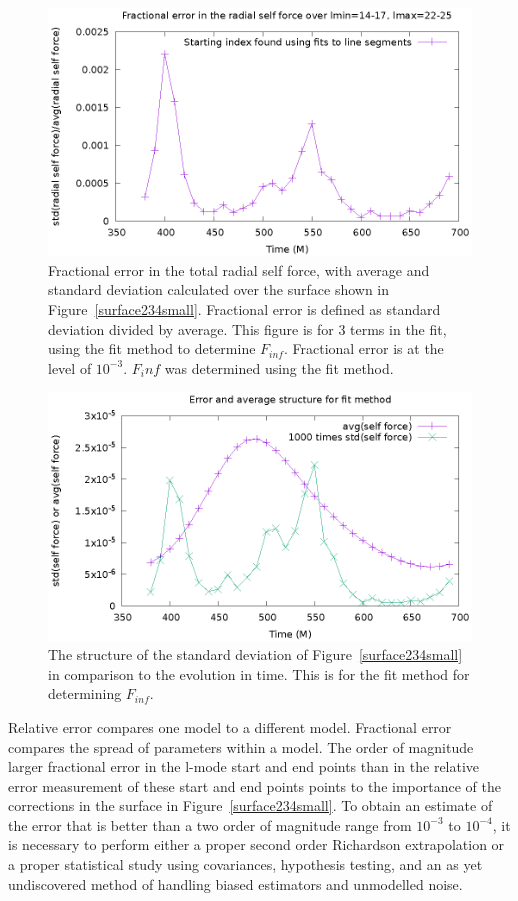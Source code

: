 \begin{figure}
  \includegraphics{fractionalErrorOverTimeFits}
  \caption{Fractional error in the total radial self force, with average and standard deviation calculated over the surface shown in Figure~\ref{surface234small}. Fractional error is defined as standard deviation divided by average. This figure is for 3 terms in the fit, using the fit method to determine $F_{inf}$. Fractional error is at the level of $10^{-3}$. $F_inf$ was determined using the fit method.}
  \label{fitfracerr}
\end{figure}


\begin{figure}
  \includegraphics{structErrFitMethod}
  \caption{The structure of the standard deviation of Figure~\ref{surface234small} in comparison to the evolution in time. This is for the fit method for determining $F_{inf}$.}
  \label{twopeaks}
\end{figure}

Relative error compares one model to a different model. Fractional error compares the spread of parameters within a model. The order of magnitude larger fractional error in the l-mode start and end points than in the relative error measurement of these start and end points points to the importance of the corrections in the surface in Figure~\ref{surface234small}. To obtain an estimate of the error that is better than a two order of magnitude range from $10^{-3}$ to $10^{-4}$, it is necessary to perform either a proper second order Richardson extrapolation or a proper statistical study using covariances, hypothesis testing, and an as yet undiscovered method of handling biased estimators and unmodelled noise. 


